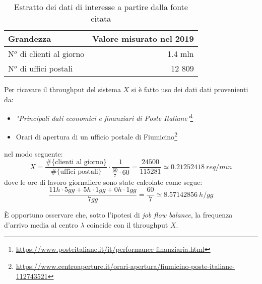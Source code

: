 \begin{table}[ht]
\centering
{\tablecolors
\begin{tabular}{| l | r |}
\hline
Grandezza & Valore misurato nel 2019 \\
\hline
N$^o$ di clienti al giorno & 1.4 mln \\
\hline
N$^o$ di uffici postali & 12 809 \\
\hline
\end{tabular}}
\caption{Estratto dei dati di interesse a partire dalla fonte citata}
\label{table:modello-specifiche-2}
\end{table}

Per ricavare il throughput del sistema $X$ si è fatto uso dei dati dati provenienti da:
\begin{itemize}
\item \textsl{"Principali dati economici e finanziari di Poste Italiane"}\footnote{\url{https://www.posteitaliane.it/it/performance-finanziaria.html}}
\item Orari di apertura di un ufficio postale di Fiumicino\footnote{\url{https://www.centroaperture.it/orari-apertura/fiumicino-poste-italiane-112743521}}
\end{itemize}
nel modo seguente:
\begin{equation}
X = \frac{\# \lbrace \text{clienti al giorno} \rbrace}{\# \lbrace \text{uffici postali} \rbrace} \cdot \frac{1}{\frac{60}{7} \cdot 60} = \frac{24500}{115281} \simeq 0.21252418\ req/min
\end{equation} 
dove le ore di lavoro giornaliere sono state calcolate come segue:
\begin{equation}
\label{eqn:modello-specifiche-15}
\frac{11h \cdot 5gg + 5h \cdot 1gg + 0h \cdot 1gg}{7gg} = \frac{60}{7} \simeq 8.57142856\ h/gg  
\end{equation}

È opportuno osservare che, sotto l'ipotesi di \textsl{job flow balance}, la frequenza d'arrivo media al centro $\lambda$ coincide con il throughput $X$.


















